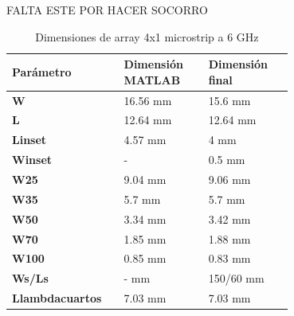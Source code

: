 FALTA ESTE POR HACER SOCORRO

\begin{table}[H]
  
   \label{tab:array4x12}
   \small %
   \centering %
   \begin{tabular}{m{0.2\linewidth}m{0.25\linewidth}m{0.25\linewidth}} %
   \toprule[\heavyrulewidth]\toprule[\heavyrulewidth]
   \textbf{Parámetro} & \textbf{Dimensión MATLAB} & \textbf{Dimensión final} \\ 
   \midrule
   \textbf{W} & 16.56 mm & 15.6 mm \\
   \textbf{L} & 12.64 mm & 12.64 mm\\
   \textbf{Linset} & 4.57 mm & 4 mm\\
   \textbf{Winset} & - & 0.5 mm\\
   \textbf{W25} & 9.04 mm & 9.06 mm\\
   \textbf{W35} & 5.7 mm & 5.7 mm\\
   \textbf{W50} & 3.34 mm & 3.42 mm\\
   \textbf{W70} & 1.85 mm & 1.88 mm\\
   \textbf{W100} & 0.85 mm & 0.83 mm\\
   \textbf{Ws/Ls} & - mm & 150/60 mm\\
   \textbf{Llambdacuartos} & 7.03 mm & 7.03 mm\\
   \bottomrule[\heavyrulewidth] 
   \end{tabular}
   \caption{Dimensiones de array 4x1 microstrip a 6 GHz} 
\end{table}